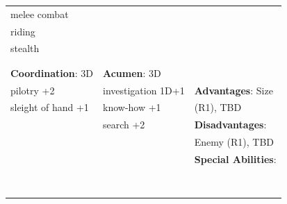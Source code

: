 \documentclass[10pt]{article}
\begin{document}
\begin{table}
\begin{tabular}{m{156pt} m{156pt} m{156pt}}
melee combat         \hrulefill &  \hrulefill & \\

riding               \hrulefill &  \hrulefill & \\

stealth              \hrulefill &  \hrulefill & \\

 \hrulefill &  \hrulefill & \\

 \hrulefill &  \hrulefill & \\


\textbf{Coordination}: 3D \hrulefill & \textbf{Acumen}: 3D \hrulefill     & \hrulefill \\

pilotry           +2 \hrulefill & investigation   1D+1 \hrulefill & \textbf{Advantages}: Size \hrulefill \\

sleight of hand   +1 \hrulefill & know-how          +1 \hrulefill & (R1), TBD \hrulefill \\

 \hrulefill & search            +2 \hrulefill & \textbf{Disadvantages}: \hrulefill \\

 \hrulefill &  \hrulefill & Enemy (R1), TBD \hrulefill \\

 \hrulefill &  \hrulefill & \textbf{Special Abilities}: \hrulefill \\

 \hrulefill &  \hrulefill &  \hrulefill \\

 \hrulefill &  \hrulefill &  \hrulefill \\

 \hrulefill &  \hrulefill &  \hrulefill \\

 \hrulefill &  \hrulefill &  \hrulefill \\

 \hrulefill &  \hrulefill &  \hrulefill \\

 \hrulefill &  \hrulefill &  \hrulefill \\

 \hrulefill &  \hrulefill &  \hrulefill \\

 \hrulefill &  \hrulefill &  \hrulefill \\



\end{tabular}
\end{table}
\end{document}
